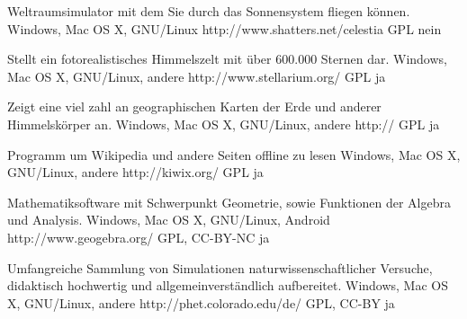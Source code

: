 \documentclass[11pt,a4paper,landscape,twocolumn]{article}
\begin{document}


{Weltraumsimulator mit dem Sie durch das Sonnensystem fliegen können.}
{Windows, Mac OS X, GNU/Linux}
{http://www.shatters.net/celestia}
{GPL}
{nein}

{Stellt ein fotorealistisches Himmelszelt mit über 600.000 Sternen dar.}
{Windows, Mac OS X, GNU/Linux, andere}
{http://www.stellarium.org/}
{GPL}
{ja}

{Zeigt eine viel zahl an geographischen Karten der Erde und anderer Himmelskörper an.}
{Windows, Mac OS X, GNU/Linux, andere}
{http://}
{GPL}
{ja}

\newpage %

{Programm um Wikipedia und andere Seiten offline zu lesen}
{Windows, Mac OS X, GNU/Linux, andere}
{http://kiwix.org/}
{GPL}
{ja}

{Mathematiksoftware mit Schwerpunkt Geometrie, sowie Funktionen der Algebra und Analysis.}
{Windows, Mac OS X, GNU/Linux, Android}
{http://www.geogebra.org/}
{GPL, CC-BY-NC}
{ja}

{Umfangreiche Sammlung von Simulationen naturwissenschaftlicher Versuche, didaktisch hochwertig und allgemeinverständlich aufbereitet.}
{Windows, Mac OS X, GNU/Linux, andere}
{http://phet.colorado.edu/de/}
{GPL, CC-BY}
{ja}
\end{document}
